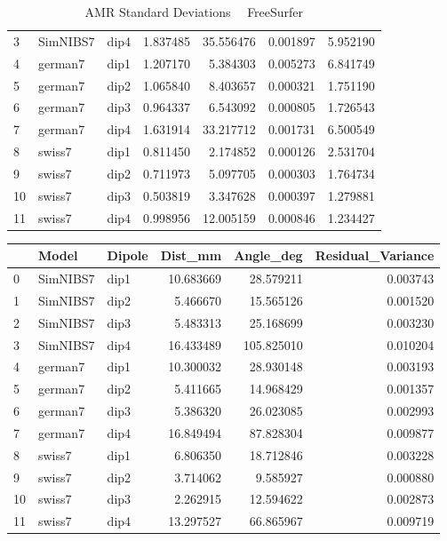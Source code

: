 \begin{table}
\begin{tabular}{lllrrrr}
3  &  SimNIBS7 &   dip4 &  1.837485 &  35.556476 &           0.001897 &         5.952190 \\
4  &   german7 &   dip1 &  1.207170 &   5.384303 &           0.005273 &         6.841749 \\
5  &   german7 &   dip2 &  1.065840 &   8.403657 &           0.000321 &         1.751190 \\
6  &   german7 &   dip3 &  0.964337 &   6.543092 &           0.000805 &         1.726543 \\
7  &   german7 &   dip4 &  1.631914 &  33.217712 &           0.001731 &         6.500549 \\
8  &    swiss7 &   dip1 &  0.811450 &   2.174852 &           0.000126 &         2.531704 \\
9  &    swiss7 &   dip2 &  0.711973 &   5.097705 &           0.000303 &         1.764734 \\
10 &    swiss7 &   dip3 &  0.503819 &   3.347628 &           0.000397 &         1.279881 \\
11 &    swiss7 &   dip4 &  0.998956 &  12.005159 &           0.000846 &         1.234427 \\
\bottomrule
\end{tabular}
\caption{AMR Standard Deviations \ \textemdash \ FreeSurfer}
\end{table}\begin{tabular}{lllrrr}
\toprule
{} &     Model & Dipole &    Dist\_mm &   Angle\_deg &  Residual\_Variance \\
\midrule
0  &  SimNIBS7 &   dip1 &  10.683669 &   28.579211 &           0.003743 \\
1  &  SimNIBS7 &   dip2 &   5.466670 &   15.565126 &           0.001520 \\
2  &  SimNIBS7 &   dip3 &   5.483313 &   25.168699 &           0.003230 \\
3  &  SimNIBS7 &   dip4 &  16.433489 &  105.825010 &           0.010204 \\
4  &   german7 &   dip1 &  10.300032 &   28.930148 &           0.003193 \\
5  &   german7 &   dip2 &   5.411665 &   14.968429 &           0.001357 \\
6  &   german7 &   dip3 &   5.386320 &   26.023085 &           0.002993 \\
7  &   german7 &   dip4 &  16.849494 &   87.828304 &           0.009877 \\
8  &    swiss7 &   dip1 &   6.806350 &   18.712846 &           0.003228 \\
9  &    swiss7 &   dip2 &   3.714062 &    9.585927 &           0.000880 \\
10 &    swiss7 &   dip3 &   2.262915 &   12.594622 &           0.002873 \\
11 &    swiss7 &   dip4 &  13.297527 &   66.865967 &           0.009719 \\
\bottomrule
\end{tabular}


